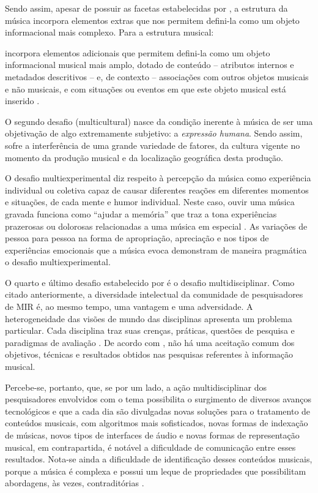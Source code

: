 Sendo assim, apesar de possuir as facetas estabelecidas por \cite{downie2003}, a estrutura da música incorpora elementos extras que nos permitem defini-la como um objeto informacional mais complexo. Para  a estrutura musical:

\begin{citacao}
    [...] incorpora elementos adicionais que permitem defini-la como um objeto informacional musical mais amplo, dotado de conteúdo – atributos internos e metadados descritivos – e, de contexto – associações com outros objetos musicais e não musicais, e com situações ou eventos em que este objeto musical está inserido \cite{cruz2014}.
\end{citacao}

O segundo desafio (multicultural) nasce da condição inerente à música de ser uma objetivação de algo extremamente subjetivo: a \textit{expressão humana}. Sendo assim, sofre a interferência de uma grande variedade de fatores, da cultura vigente no momento da produção musical e da localização geográfica desta produção.

O desafio multiexperimental diz respeito à percepção da música como experiência individual ou coletiva capaz de causar diferentes reações em diferentes momentos e situações, de cada mente e humor individual. Neste caso, ouvir uma música gravada funciona como “ajudar a memória” que traz a tona experiências prazerosas ou dolorosas relacionadas a uma música em especial \cite{downie2003,santini&souza2007}. As variações de pessoa para pessoa na forma de apropriação, apreciação e nos tipos de experiências emocionais que a música evoca demonstram de maneira pragmática o desafio multiexperimental.

O quarto e último desafio estabelecido por  é o desafio multidisciplinar. Como citado anteriormente, a diversidade intelectual da comunidade de pesquisadores de MIR é, ao mesmo tempo, uma vantagem e uma adversidade. A heterogeneidade das visões de mundo das disciplinas apresenta um problema particular. Cada disciplina traz suas crenças, práticas, questões de pesquisa e paradigmas de avaliação \cite{downie2003}. De acordo com , não há uma aceitação comum dos objetivos, técnicas e resultados obtidos nas pesquisas referentes à informação musical.

Percebe-se, portanto, que, se por um lado, a ação multidisciplinar dos pesquisadores envolvidos com o tema possibilita o surgimento de diversos avanços tecnológicos e que a cada dia são divulgadas novas soluções para o tratamento de conteúdos musicais, com algoritmos mais sofisticados, novas formas de indexação de músicas, novos tipos de interfaces de áudio e novas formas de representação musical, em contrapartida, é notável a dificuldade de comunicação entre esses resultados. Nota-se ainda a dificuldade de identificação desses conteúdos musicais, porque a música é complexa e possui um leque de propriedades que possibilitam abordagens, às vezes, contraditórias \cite{cruz2014}.


